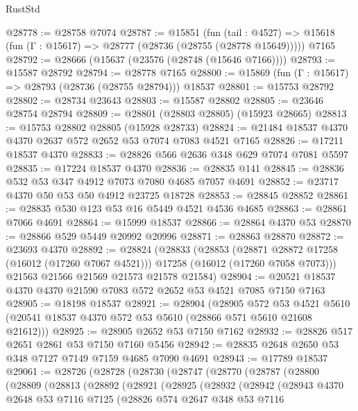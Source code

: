 \begin{lexlean}{RustStd}
\begin{coremodule}
@28778 := @28758 @7074
@28787 := @15851
    (fun (tail : @4527) => @15618 (fun (Γ : @15617) => @28777 (@28736 (@28755 (@28778 @15649)))))
    @7165
@28792 := @28666 (@15637 (@23576 (@28748 (@15646 @7166))))
@28793 := @15587 @28792
@28794 := @28778 @7165
@28800 := @15869 (fun (Γ : @15617) => @28793 (@28736 (@28755 @28794))) @18537
@28801 := @15753 @28792
@28802 := @28734 @23643
@28803 := @15587 @28802
@28805 := @23646 @28754 @28794
@28809 := @28801 (@28803 @28805) (@15923 @28665)
@28813 := @15753 @28802 @28805 (@15928 @28733)
@28824 := @21484 @18537 @4370 @4370 @2637 @572 @2652 @53 @7074 @7083 @4521 @7165
@28826 := @17211 @18537 @4370
@28833 := @28826 @566 @2636 @348 @629 @7074 @7081 @5597
@28835 := @17224 @18537 @4370
@28836 := @28835 @141
@28845 := @28836 @532 @53 @347 @4912 @7073 @7080 @4685 @7057 @4691
@28852 := @23717 @4370 @50 @53 @50 @4912 @23725 @18728
@28853 := @28845 @28852
@28861 := @28835 @530 @123 @53 @16 @5449 @4521 @4536 @4685
@28863 := @28861 @7066 @4691
@28864 := @15999 @18537
@28866 := @28864 @4370 @53
@28870 := @28866 @529 @5449 @20992 @20996
@28871 := @28863 @28870
@28872 := @23693 @4370
@28892 := @28824
    (@28833
      (@28853
        (@28871 @28872 @17258 (@16012 (@17260 @7067 @4521)))
        @17258
        (@16012 (@17260 @7058 @7073)))
      @21563
      @21566
      @21569
      @21573
      @21578
      @21584)
@28904 := @20521 @18537 @4370 @4370 @21590 @7083 @572 @2652 @53 @4521 @7085 @7150 @7163
@28905 := @18198 @18537
@28921 := @28904
    (@28905
      @572
      @53
      @4521
      @5610
      (@20541 @18537 @4370 @572 @53 @5610 (@28866 @571 @5610 @21608 @21612)))
@28925 := @28905 @2652 @53 @7150 @7162
@28932 := @28826 @517 @2651 @2861 @53 @7150 @7160 @5456
@28942 := @28835 @2648 @2650 @53 @348 @7127 @7149 @7159 @4685 @7090 @4691
@28943 := @17789 @18537
@29061 := @28726
    (@28728
      (@28730
        (@28747
          (@28770
            (@28787
              (@28800
                (@28809
                  (@28813
                    (@28892
                      (@28921
                        (@28925
                          (@28932
                            (@28942
                              (@28943
                                @4370
                                @2648
                                @53
                                @7116
                                @7125
                                (@28826
                                  @574
                                  @2647
                                  @348
                                  @53
                                  @7116

\end{coremodule}
\end{lexlean}
